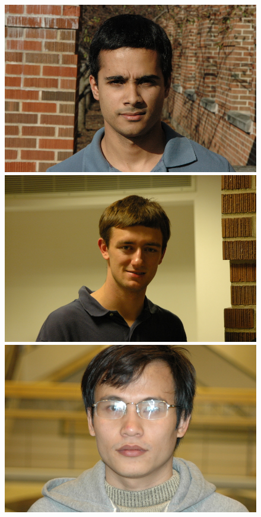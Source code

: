 \begin{figure}
\includegraphics[scale=0.35,clip=true]{figures_cvpr/examples/1/DSC_1622.jpg} 
\includegraphics[scale=0.35,clip=true]{figures_cvpr/examples/1/DSC_1786.jpg} \\
\includegraphics[scale=0.35,clip=true]{figures_cvpr/examples/2/DSC_1448.jpg} 

\end{figure}
